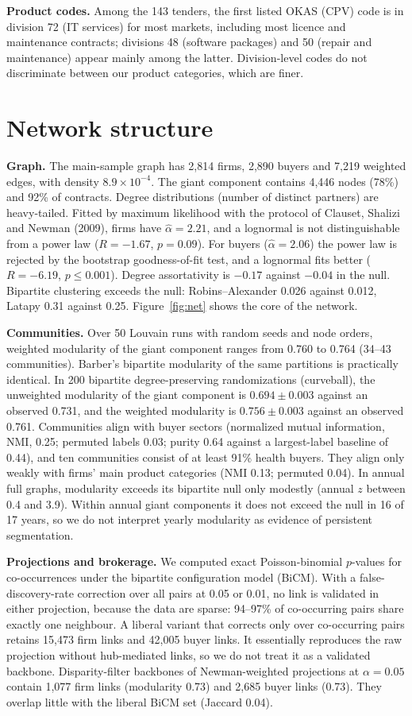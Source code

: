 \documentclass[11pt,a4paper]{article}
\begin{document}
\textbf{Product codes.} Among the 143 tenders, the first listed OKAS (CPV) code is in division 72 (IT services) for most markets, including most licence and maintenance contracts; divisions 48 (software packages) and 50 (repair and maintenance) appear mainly among the latter. Division-level codes do not discriminate between our product categories, which are finer.

\section{Network structure}
\textbf{Graph.} The main-sample graph has 2,814 firms, 2,890 buyers and 7,219 weighted edges, with density $8.9\times10^{-4}$. The giant component contains 4,446 nodes (78\%) and 92\% of contracts. Degree distributions (number of distinct partners) are heavy-tailed. Fitted by maximum likelihood with the protocol of Clauset, Shalizi and Newman (2009), firms have $\hat\alpha=2.21$, and a lognormal is not distinguishable from a power law ($R=-1.67$, $p=0.09$). For buyers ($\hat\alpha=2.06$) the power law is rejected by the bootstrap goodness-of-fit test, and a lognormal fits better ($R=-6.19$, $p\leq0.001$). Degree assortativity is $-0.17$ against $-0.04$ in the null. Bipartite clustering exceeds the null: Robins--Alexander 0.026 against 0.012, Latapy 0.31 against 0.25. Figure~\ref{fig:net} shows the core of the network.

\textbf{Communities.} Over 50 Louvain runs with random seeds and node orders, weighted modularity of the giant component ranges from 0.760 to 0.764 (34--43 communities). Barber's bipartite modularity of the same partitions is practically identical. In 200 bipartite degree-preserving randomizations (curveball), the unweighted modularity of the giant component is $0.694\pm0.003$ against an observed 0.731, and the weighted modularity is $0.756\pm0.003$ against an observed 0.761. Communities align with buyer sectors (normalized mutual information, NMI, 0.25; permuted labels 0.03; purity 0.64 against a largest-label baseline of 0.44), and ten communities consist of at least 91\% health buyers. They align only weakly with firms' main product categories (NMI 0.13; permuted 0.04). In annual full graphs, modularity exceeds its bipartite null only modestly (annual $z$ between 0.4 and 3.9). Within annual giant components it does not exceed the null in 16 of 17 years, so we do not interpret yearly modularity as evidence of persistent segmentation.

\textbf{Projections and brokerage.} We computed exact Poisson-binomial $p$-values for co-occurrences under the bipartite configuration model (BiCM). With a false-discovery-rate correction over all pairs at 0.05 or 0.01, no link is validated in either projection, because the data are sparse: 94--97\% of co-occurring pairs share exactly one neighbour. A liberal variant that corrects only over co-occurring pairs retains 15,473 firm links and 42,005 buyer links. It essentially reproduces the raw projection without hub-mediated links, so we do not treat it as a validated backbone. Disparity-filter backbones of Newman-weighted projections at $\alpha=0.05$ contain 1,077 firm links (modularity 0.73) and 2,685 buyer links (0.73). They overlap little with the liberal BiCM set (Jaccard 0.04).
\end{document}

